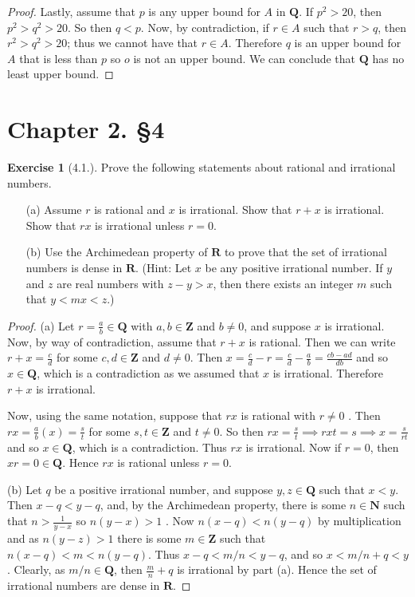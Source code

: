 \documentclass[9pt,reqno]{amsart}
\theoremstyle{definition}
\newtheorem{exercise}{Exercise}[section]
\newcommand{\rr}{\mathbf R}
\newcommand{\nn}{\mathbf N}
\newcommand{\zz}{\mathbf Z}
\newcommand{\qq}{\mathbf Q}
\begin{document}
\begin{proof}
		Lastly, assume that $p$ is any upper bound for $A$ in $\qq$. If $p^2> 20$, then $p^2 > q^2 > 20$. So then $q < p$. Now, by contradiction, if $r \in A$ such that $r > q$, then $r^2 > q^2 >20$; thus we cannot have that $r \in A$. Therefore $q$ is an upper bound for $A$ that is less than $p$ so $o$ is not an upper bound. We can conclude that $\qq$ has no least upper bound. 
		\end{proof}
		
\section{Chapter 2. \S 4}
\begin{exercise}[4.1.] Prove the following statements about rational and irrational numbers.
\begin{itemize}
	\item[(a)] Assume $r$ is rational and $x$ is irrational. Show that $r+x$ is irrational. Show that $rx$ is irrational unless $r = 0$.
	\item[(b)] Use the Archimedean property of $\rr$ to prove that the set of irrational numbers is dense in $\rr$. (Hint: Let $x$ be any positive irrational number. If $y$ and $z$ are  real numbers with $z-y > x$, then there exists an integer $m$ such that $y < mx < z$.)
\end{itemize}
\end{exercise}
\begin{proof}
	(a) Let $r = \frac{a}{b} \in \qq$ with $a, b \in \zz$ and $b \neq 0$, and suppose $x$ is irrational. Now, by way of contradiction, assume that $r + x$ is rational. Then we can write $r+x = \frac{c}{d}$ for some $c, d \in \zz$ and $d \neq 0$. Then $x = \frac{c}{d} -r = \frac{c}{d} - \frac{a}{b}=\frac{cb -ad}{db}$ and so $x \in \qq$, which is a contradiction as we assumed that $x$ is irrational. Therefore $r+x$ is irrational. 
	
	Now, using the same notation, suppose that $rx$ is rational with $r \neq 0$ . Then $rx = \frac{a}{b}(x) = \frac{s}{t}$ for some $s, t \in \zz$ and $t \neq 0$. So then $rx = \frac{s}{t} \implies rxt = s \implies x = \frac{s}{rt}$ and so $x \in \qq$, which is a contradiction. Thus $rx$ is irrational. Now if $r = 0$, then $xr = 0 \in \qq$. Hence $rx$ is rational unless $r = 0$.
	
	(b) Let $q$ be a positive irrational number, and suppose $y, z \in \qq$ such that $x<y$. Then $x - q < y - q$, and, by the Archimedean property, there is some $n \in \nn$ such that $n > \frac{1}{y-x}$ so $n(y-x) >1$ . Now $n(x-q)<n(y-q)$ by multiplication and as $n(y-z) >1$ there is some $ m \in \zz$ such that $n(x-q) < m < n(y-q)$. Thus $x-q <m/n < y- q$, and so $x< m/n + q <y$. Clearly, as $m/n \in \qq$, then $\frac{m}{n} + q$ is irrational by part (a). Hence the set of irrational numbers are dense in $\rr$. 
\end{proof}
\end{document}
